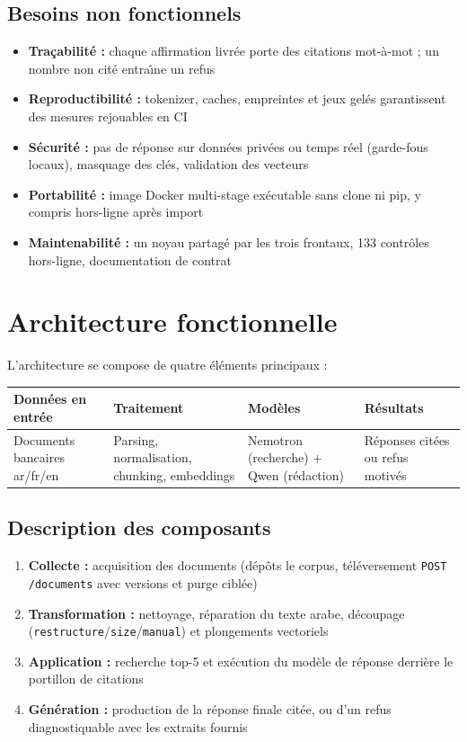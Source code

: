 \documentclass[a4paper,12pt]{report}
\begin{document}
\subsection{Besoins non fonctionnels}
\begin{itemize}
    \item \textbf{Tra\c{c}abilit\'e :} chaque affirmation livr\'ee porte des citations mot-\`a-mot ; un nombre non cit\'e entra\^{\i}ne un refus
    \item \textbf{Reproductibilit\'e :} tokenizer, caches, empreintes et jeux gel\'es garantissent des mesures rejouables en CI
    \item \textbf{S\'ecurit\'e :} pas de r\'eponse sur donn\'ees priv\'ees ou temps r\'eel (garde-fous locaux), masquage des cl\'es, validation des vecteurs
    \item \textbf{Portabilit\'e :} image Docker multi-stage ex\'ecutable sans clone ni pip, y compris hors-ligne apr\`es import
    \item \textbf{Maintenabilit\'e :} un noyau partag\'e par les trois frontaux, 133 contr\^oles hors-ligne, documentation de contrat
\end{itemize}

\section{Architecture fonctionnelle}

L'architecture se compose de quatre \'el\'ements principaux :

\begin{center}
\begin{tabular}{|p{3cm}|p{3cm}|p{3cm}|p{3cm}|}
\hline
\textbf{Donn\'ees en entr\'ee} & \textbf{Traitement} & \textbf{Mod\`eles} & \textbf{R\'esultats} \\
\hline
Documents bancaires ar/fr/en & Parsing, normalisation, chunking, embeddings & Nemotron (recherche) + Qwen (r\'edaction) & R\'eponses cit\'ees ou refus motiv\'es \\
\hline
\end{tabular}
\end{center}

\subsection{Description des composants}
\begin{enumerate}
    \item \textbf{Collecte :} acquisition des documents (d\'ep\^ots le corpus, t\'el\'eversement \texttt{POST /documents} avec versions et purge cibl\'ee)
    \item \textbf{Transformation :} nettoyage, r\'eparation du texte arabe, d\'ecoupage (\texttt{restructure}/\texttt{size}/\texttt{manual}) et plongements vectoriels
    \item \textbf{Application :} recherche top-5 et ex\'ecution du mod\`ele de r\'eponse derri\`ere le portillon de citations
    \item \textbf{G\'en\'eration :} production de la r\'eponse finale cit\'ee, ou d'un refus diagnostiquable avec les extraits fournis
\end{enumerate}
\end{document}
